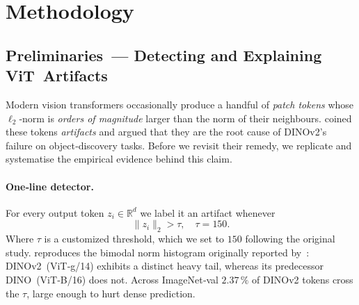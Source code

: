 \documentclass{article}
\newcommand{\citet}{\textcite}
\begin{document}
\section{Methodology}
\label{sec:method}



\subsection{Preliminaries — Detecting and Explaining ViT Artifacts}
\label{sec:prelim}

Modern vision transformers occasionally produce a handful of \emph{patch tokens} whose $\ell_2$‑norm is \emph{orders of magnitude} larger than the norm of their neighbours.  
\citet{darcetVisionTransformersNeed2024} coined these tokens \emph{artifacts} and argued that they are the root cause of DINOv2’s failure on object‑discovery tasks.
Before we revisit their remedy, we replicate and systematise the empirical evidence behind this claim.

\paragraph{One‑line detector.}
For every output token $z_i\!\in\!\mathbb R^{d}$ we label it an artifact whenever 
\begin{equation}
\|z_i\|_{2}>\tau, \quad \tau=150.
\end{equation}
Where $\tau$ is a customized threshold, which we set to $150$ following the original study. 
 reproduces the bimodal norm histogram originally reported by \citet{darcetVisionTransformersNeed2024}:
DINOv2 (ViT‑g/14) exhibits a distinct heavy tail, whereas its predecessor DINO (ViT‑B/16) does not.
Across ImageNet‑val $2.37\,\%$ of DINOv2 tokens cross the $\tau$, large enough to hurt dense prediction.
\end{document}

